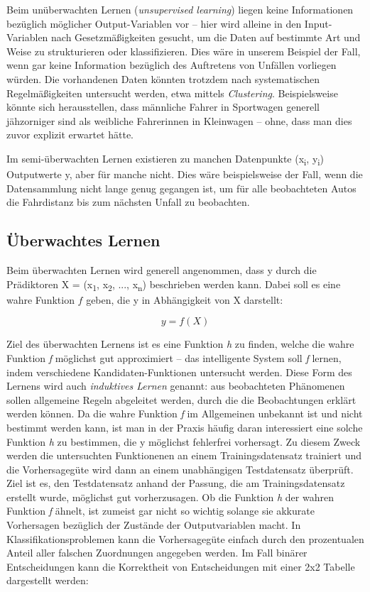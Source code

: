 \vspace{0.3cm}

Beim unüberwachten Lernen (\emph{unsupervised learning}) liegen keine Informationen
bezüglich möglicher Output-Variablen vor -- hier wird alleine in den Input-Variablen
nach Gesetzmäßigkeiten gesucht, um die Daten auf bestimmte Art und Weise zu
strukturieren oder klassifizieren. Dies wäre in unserem Beispiel der Fall, wenn gar
keine Information bezüglich des Auftretens von Unfällen vorliegen würden. Die
vorhandenen Daten könnten trotzdem nach systematischen Regelmäßigkeiten untersucht
werden, etwa mittels \emph{Clustering}. Beispielsweise könnte sich herausstellen,
dass männliche Fahrer in Sportwagen generell jähzorniger sind als weibliche
Fahrerinnen in Kleinwagen -- ohne, dass man dies zuvor explizit erwartet hätte.

Im semi-überwachten Lernen existieren zu manchen Datenpunkte (x\textsubscript{i},
y\textsubscript{i}) Outputwerte y, aber für manche nicht. Dies wäre beispielsweise
der Fall, wenn die Datensammlung nicht lange genug gegangen ist, um für alle
beobachteten Autos die Fahrdistanz bis zum nächsten Unfall zu beobachten.

\subsection{Überwachtes Lernen}

Beim überwachten Lernen wird generell angenommen, dass y durch die Prädiktoren X =
(x\textsubscript{1}, x\textsubscript{2}, ..., x\textsubscript{n}) beschrieben werden
kann. Dabei soll es eine wahre Funktion $f$ geben, die y in Abhängigkeit von X
darstellt:

\begin{equation*}
y = f(X)
\end{equation*}


Ziel des überwachten Lernens ist es eine Funktion \emph{h} zu finden, welche die
wahre Funktion \emph{f} möglichst gut approximiert -- das intelligente System soll
\emph{f} lernen, indem verschiedene Kandidaten-Funktionen untersucht werden. Diese
Form des Lernens wird auch \emph{induktives Lernen} genannt: aus beobachteten
Phänomenen sollen allgemeine Regeln abgeleitet werden, durch die die Beobachtungen
erklärt werden können. Da die wahre Funktion \emph{f} im Allgemeinen unbekannt ist
und nicht bestimmt werden kann, ist man in der Praxis häufig daran interessiert eine
solche Funktion \emph{h} zu bestimmen, die y möglichst fehlerfrei vorhersagt. Zu
diesem Zweck werden die untersuchten Funktionenen an einem Trainingsdatensatz
trainiert und die Vorhersagegüte wird dann an einem unabhängigen Testdatensatz
überprüft. Ziel ist es, den Testdatensatz anhand der Passung, die am
Trainingsdatensatz erstellt wurde, möglichst gut vorherzusagen.  Ob die Funktion
\emph{h} der wahren Funktion \emph{f} ähnelt, ist zumeist gar nicht so wichtig
solange sie akkurate Vorhersagen bezüglich der Zustände der Outputvariablen macht. In
Klassifikationsproblemen kann die Vorhersagegüte einfach durch den prozentualen
Anteil aller falschen Zuordnungen angegeben werden. Im Fall binärer Entscheidungen
kann die Korrektheit von Entscheidungen mit einer 2x2 Tabelle dargestellt werden:

